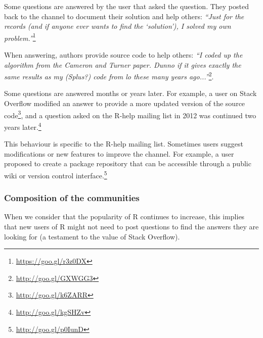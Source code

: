 \documentclass[smallextended]{svjour3}       %
\newcommand{\SO}{Stack Overflow\xspace}
\newcommand{\RH}{R-help\xspace}
\begin{document}
\begin{description}[itemsep=2pt, topsep=0pt, leftmargin=1em, parsep=0pt]
\item[I answered my own question:] Some questions are answered by the user that asked the question. They posted back to the channel to document their solution and help others: \textit{``Just for the records (and if anyone ever wants to find the `solution'), I solved my own problem.''}\footnote{\url{https://goo.gl/r3z0DX}} 
 
\item[I did it for you:] When answering, authors provide source code to help others: \textit{``I coded up the algorithm from the Cameron and Turner paper. Dunno if it gives exactly the same results as my (Splus?) code from lo these many years ago...''}\footnote{\url{http://goo.gl/GXWGG3}}.

\item[Updated or continued years later:] Some questions are answered months or years later.
For example, a user on \SO modified an answer to provide a more updated version of the source code\footnote{\url{http://goo.gl/k6ZARR}}, and a {question asked on the \RH mailing list in 2012 was continued two years later.}\footnote{\url{http://goo.gl/kgSHZv}}

\item[Ideas to improve the channel:] This behaviour is specific to the \RH mailing list. Sometimes users suggest modifications or new features to improve the channel. For example, a {user proposed to create a package repository that can be accessible through a public wiki or version control interface.}\footnote{\url{http://goo.gl/p0IunD}}
\end{description}


\subsubsection{Composition of the communities}
{
  }

  When we consider that the popularity of R continues to increase, this implies
that new users of R might not need to post questions to find the answers they are looking for (a testament to the value
of \SO).
\end{document}
